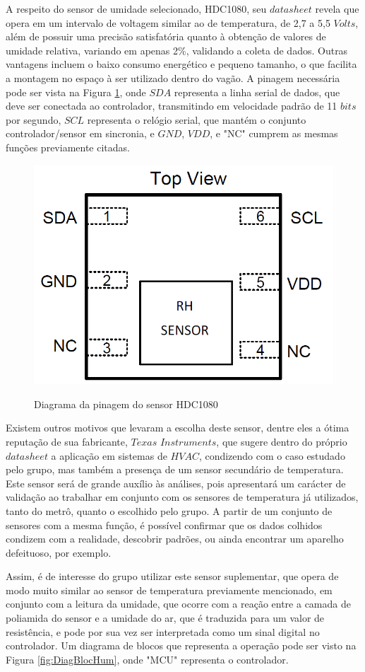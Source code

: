 \documentclass[acronym,symbols]{fei}
\begin{document}
A respeito do sensor de umidade selecionado, HDC1080, seu $datasheet$ revela que opera em um intervalo de voltagem similar ao de temperatura, de 2,7 a 5,5 $Volts$, além de possuir uma precisão satisfatória quanto à obtenção de valores de umidade relativa, variando em apenas 2\%, validando a coleta de dados. Outras vantagens incluem o baixo consumo energético e pequeno tamanho, o que facilita a montagem no espaço à ser utilizado dentro do vagão. A pinagem necessária pode ser vista na Figura \ref{fig:PinHum}, onde $SDA$ representa a linha serial de dados, que deve ser conectada ao controlador, transmitindo em velocidade padrão de 11 $bits$ por segundo, $SCL$ representa o relógio serial, que mantém o conjunto controlador/sensor em sincronia, e $GND$, $VDD$, e "NC" cumprem as mesmas funções previamente citadas.

\begin{figure}[!htb]
\centering
    \caption{Diagrama da pinagem do sensor HDC1080}
    \includegraphics[width=0.6\linewidth]{Imagens/PinHum.png}
    \label{fig:PinHum}
\end{figure}

Existem outros motivos que levaram a escolha deste sensor, dentre eles a ótima reputação de sua fabricante, $Texas$ $Instruments$, que sugere dentro do próprio $datasheet$ a aplicação em sistemas de $HVAC$, condizendo com o caso estudado pelo grupo, mas também a presença de um sensor secundário de temperatura. Este sensor será de grande auxílio às análises, pois apresentará um carácter de validação ao trabalhar em conjunto com os sensores de temperatura já utilizados, tanto do metrô, quanto o escolhido pelo grupo. A partir de um conjunto de sensores com a mesma função, é possível confirmar que os dados colhidos condizem com a realidade, descobrir padrões, ou ainda encontrar um aparelho defeituoso, por exemplo. 

Assim, é de interesse do grupo utilizar este sensor suplementar, que opera de modo muito similar ao sensor de temperatura previamente mencionado, em conjunto com a leitura da umidade, que ocorre com a reação entre a camada de poliamida do sensor e a umidade do ar, que é traduzida para um valor de resistência, e pode por sua vez ser interpretada como um sinal digital no controlador. Um diagrama de blocos que representa a operação pode ser visto na Figura \ref{fig:DiagBlocHum}, onde "MCU" representa o controlador.
\end{document}

